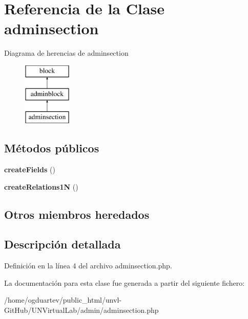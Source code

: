 \hypertarget{classadminsection}{}\section{Referencia de la Clase adminsection}
\label{classadminsection}
Diagrama de herencias de adminsection\begin{figure}[H]
\begin{center}
\leavevmode
\includegraphics[height=3.000000cm]{classadminsection}
\end{center}
\end{figure}
\subsection*{Métodos públicos}
\begin{DoxyCompactItemize}
\item 
\mbox{\label{classadminsection_a0a7554bf943204d3ff77514ea9f1a46c}} 
{\bfseries create\+Fields} ()
\item 
\mbox{\label{classadminsection_af74be6a7666ed8b360ed86f193a96e33}} 
{\bfseries create\+Relations1N} ()
\end{DoxyCompactItemize}
\subsection*{Otros miembros heredados}


\subsection{Descripción detallada}


Definición en la línea 4 del archivo adminsection.\+php.



La documentación para esta clase fue generada a partir del siguiente fichero\+:\begin{DoxyCompactItemize}
\item 
/home/ogduartev/public\+\_\+html/unvl-\/\+Git\+Hub/\+U\+N\+Virtual\+Lab/admin/adminsection.\+php\end{DoxyCompactItemize}
